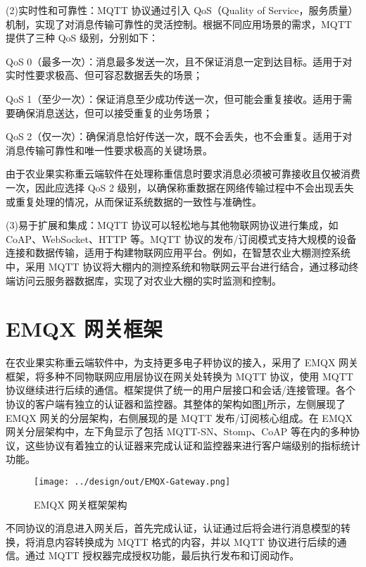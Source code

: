 (2)实时性和可靠性：MQTT 协议通过引入 QoS（Quality of Service，服务质量）机制，实现了对消息传输可靠性的灵活控制。根据不同应用场景的需求，MQTT 提供了三种 QoS 级别\cite{Jia2015}，分别如下：

QoS 0（最多一次）：消息最多发送一次，且不保证消息一定到达目标。适用于对实时性要求极高、但可容忍数据丢失的场景；

QoS 1（至少一次）：保证消息至少成功传送一次，但可能会重复接收。适用于需要确保消息送达，但可以接受重复的业务场景；

QoS 2（仅一次）：确保消息恰好传送一次，既不会丢失，也不会重复。适用于对消息传输可靠性和唯一性要求极高的关键场景。

由于农业果实称重云端软件在处理称重信息时要求消息必须被可靠接收且仅被消费一次，因此应选择 QoS 2 级别，以确保称重数据在网络传输过程中不会出现丢失或重复处理的情况，从而保证系统数据的一致性与准确性。

(3)易于扩展和集成：MQTT 协议可以轻松地与其他物联网协议进行集成，如 CoAP、WebSocket、HTTP 等。MQTT 协议的发布/订阅模式支持大规模的设备连接和数据传输，适用于构建物联网应用平台。例如，在智慧农业大棚测控系统中，采用 MQTT 协议将大棚内的测控系统和物联网云平台进行结合，通过移动终端访问云服务器数据库，实现了对农业大棚的实时监测和控制\cite{Liang2020}。

\section{EMQX 网关框架}\label{sec:emqx}

在农业果实称重云端软件中，为支持更多电子秤协议的接入，采用了 EMQX 网关框架，将多种不同物联网应用层协议在网关处转换为 MQTT 协议，使用 MQTT 协议继续进行后续的通信。框架提供了统一的用户层接口和会话/连接管理。各个协议的客户端有独立的认证器和监控器\cite{EMQX-Gateway}。其整体的架构如图\ref{fig:EMQX-Gateway}所示，左侧展现了 EMQX 网关的分层架构，右侧展现的是 MQTT 发布/订阅核心组成。在 EMQX 网关分层架构中，左下角显示了包括 MQTT-SN、Stomp、CoAP 等在内的多种协议，这些协议有着独立的认证器来完成认证和监控器来进行客户端级别的指标统计功能。

\begin{figure}
    \centering
    \texttt{[image: ../design/out/EMQX-Gateway.png]}
    \caption{EMQX 网关框架架构}
    \label{fig:EMQX-Gateway}
\end{figure}

不同协议的消息进入网关后，首先完成认证，认证通过后将会进行消息模型的转换，将消息内容转换成为 MQTT 格式的内容，并以 MQTT 协议进行后续的通信。通过 MQTT 授权器完成授权功能，最后执行发布和订阅动作。

